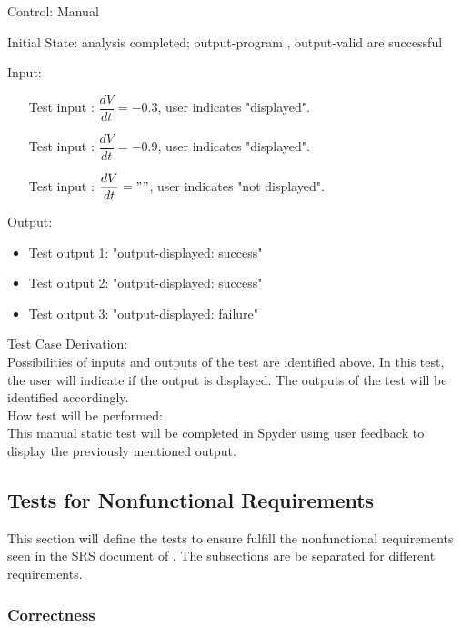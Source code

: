 \documentclass[12pt, titlepage]{article}
\newcounter{tinnum} %
\begin{document}
\begin{enumerate}
Control: Manual
					
Initial State: \progname{} analysis completed; output-program , output-valid 
are successful
					
Input:
\begin{itemize} %
\item[Test input \refstepcounter{tinnum}\thetinnum\label{Tinput_21}:] 
$\dfrac{dV}{dt} = -0.3$, user indicates "displayed".
\item[Test input \refstepcounter{tinnum}\thetinnum\label{Tinput_22}:] 
$\dfrac{dV}{dt} = -0.9$, user indicates "displayed".
\item[Test input \refstepcounter{tinnum}\thetinnum\label{Tinput_23}:] 
$\dfrac{dV}{dt} = "     "$, user indicates "not displayed".
\end{itemize}

Output: 
\begin{itemize}
\item Test output 1: "output-displayed: success"
\item Test output 2: "output-displayed: success" 
\item Test output 3: "output-displayed: failure"
\end{itemize}

Test Case Derivation:\\
Possibilities of inputs and outputs of the test are identified above. In this 
test, the user will indicate if the output is displayed. The outputs of the test 
will be identified accordingly.\\

How test will be performed: \\
This manual static test will be completed in Spyder using user feedback to 
display the previously mentioned output. \\

\end{enumerate}

\subsection{Tests for Nonfunctional Requirements}
  
This section will define the tests to ensure \progname{} fulfill the 
nonfunctional requirements seen in the SRS document of \progname{}. The 
subsections are be separated for different requirements.

\subsubsection{Correctness}
		
\end{document}
